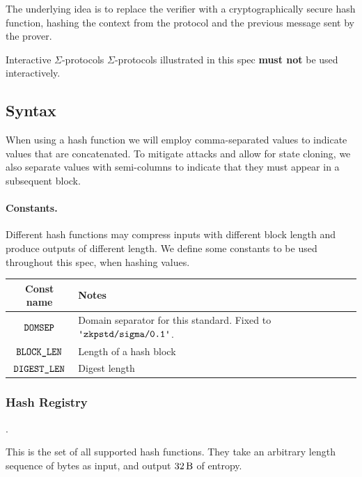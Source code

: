 \documentclass[11pt]{article}
\begin{document}
The underlying idea is to replace the verifier with a cryptographically secure hash function, hashing the context from the protocol and the previous message sent by the prover.

\begin{remark}{Interactive $\Sigma$-protocols}{} $\Sigma$-protocols illustrated in this spec \textbf{must not} be used interactively.
\end{remark}

\subsection{Syntax}

When using a hash function we will employ comma-separated values to indicate values that are concatenated.
To mitigate attacks and allow for state cloning, we also separate values with semi-columns
to indicate that they must appear in a subsequent block.

\paragraph{Constants.} Different hash functions may compress inputs with different block length and produce outputs of different length. We define some constants to be used throughout this spec, when hashing values.

\begin{center}
\begin{tabular}{cl}
  Const name & Notes \\
  \hline
  $\texttt{DOMSEP}$ & Domain separator for this standard. Fixed to $\domsepctx$.   \\
  $\texttt{BLOCK\_LEN}$ & Length of a hash block \\
  $\texttt{DIGEST\_LEN}$ & Digest length
\end{tabular}
\end{center}


\subsubsection{Hash Registry}
\label{sec:hash-registry}.

This is the set of all supported hash functions. They take an arbitrary length sequence of bytes as input, and output $\seedlen$ of entropy.
\end{document}

